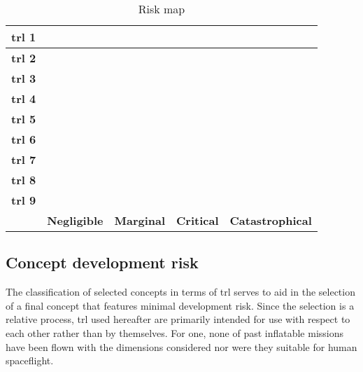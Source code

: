 \begin{table}[H]
	\centering
	\caption{Risk map}
	\label{tab:riskmap}
	\begin{tabular}{|c|c|c|c|c|} %
		\hline
		\textbf{\gls{trl} 1} & \cellcolor{green!70} & \cellcolor{yellow!75} & \cellcolor{red!60} & \cellcolor{red!60} \\ \hline
		\textbf{\gls{trl} 2} & \cellcolor{green!70} & \cellcolor{yellow!75} & \cellcolor{red!60} & \cellcolor{red!60} \\ \hline
		\textbf{\gls{trl} 3} & \cellcolor{green!70} & \cellcolor{yellow!75} & \cellcolor{red!60} & \cellcolor{red!60} \\ \hline
		\textbf{\gls{trl} 4} & \cellcolor{green!70} & \cellcolor{yellow!75} & \cellcolor{yellow!75} & \cellcolor{yellow!75} \\ \hline
		\textbf{\gls{trl} 5} & \cellcolor{green!70} & \cellcolor{green!70} & \cellcolor{yellow!75} & \cellcolor{yellow!75} \\ \hline
		\textbf{\gls{trl} 6} & \cellcolor{green!70} & \cellcolor{green!70} & \cellcolor{green!70} & \cellcolor{green!70} \\ \hline
		\textbf{\gls{trl} 7} & \cellcolor{green!70} & \cellcolor{green!70} & \cellcolor{green!70} & \cellcolor{green!70} \\ \hline
		\textbf{\gls{trl} 8} & \cellcolor{green!70} & \cellcolor{green!70} & \cellcolor{green!70} & \cellcolor{green!70} \\ \hline
		\textbf{\gls{trl} 9} & \cellcolor{green!70} & \cellcolor{green!70} & \cellcolor{green!70} & \cellcolor{green!70} \\ \hline
		 & \textbf{Negligible} & \textbf{Marginal} & \textbf{Critical} & \textbf{Catastrophical} \\ \hline
	\end{tabular}
\end{table}

\subsection{Concept development risk}

The classification of selected concepts in terms of \acrlong{trl} serves to aid in the selection of a final concept that features minimal development risk. Since the selection is a relative process, \gls{trl} used hereafter are primarily intended for use with respect to each other rather than by themselves. For one, none of past inflatable missions have been flown with the dimensions considered nor were they suitable for human spaceflight.

